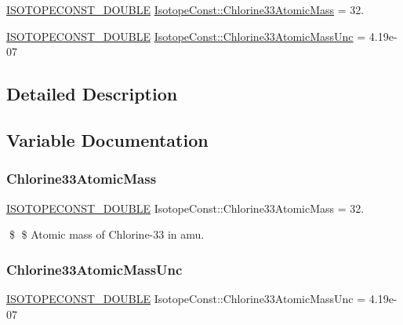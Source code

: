 \begin{DoxyCompactItemize}
\item 
\mbox{\hyperlink{group___isotope_const-_macros_ga8f45a7272ce02c0b4c65c44636ed719a}{I\+S\+O\+T\+O\+P\+E\+C\+O\+N\+S\+T\+\_\+\+D\+O\+U\+B\+LE}} \mbox{\hyperlink{group___isotope_const-_chlorine-_cl33_ga130bfbdbdea8b65bf1d6e512e2c292b9}{Isotope\+Const\+::\+Chlorine33\+Atomic\+Mass}} = 32.
\item 
\mbox{\hyperlink{group___isotope_const-_macros_ga8f45a7272ce02c0b4c65c44636ed719a}{I\+S\+O\+T\+O\+P\+E\+C\+O\+N\+S\+T\+\_\+\+D\+O\+U\+B\+LE}} \mbox{\hyperlink{group___isotope_const-_chlorine-_cl33_ga8fa151dd8b3de5e7e1838c8d92a2bc0d}{Isotope\+Const\+::\+Chlorine33\+Atomic\+Mass\+Unc}} = 4.\+19e-\/07
\end{DoxyCompactItemize}


\subsection{Detailed Description}


\subsection{Variable Documentation}
\mbox{\label{group___isotope_const-_chlorine-_cl33_ga130bfbdbdea8b65bf1d6e512e2c292b9}} 
\subsubsection{\texorpdfstring{Chlorine33\+Atomic\+Mass}{Chlorine33AtomicMass}}
{\footnotesize\ttfamily \mbox{\hyperlink{group___isotope_const-_macros_ga8f45a7272ce02c0b4c65c44636ed719a}{I\+S\+O\+T\+O\+P\+E\+C\+O\+N\+S\+T\+\_\+\+D\+O\+U\+B\+LE}} Isotope\+Const\+::\+Chlorine33\+Atomic\+Mass = 32.}

\$ \$ Atomic mass of Chlorine-\/33 in amu. \mbox{\label{group___isotope_const-_chlorine-_cl33_ga8fa151dd8b3de5e7e1838c8d92a2bc0d}} 
\subsubsection{\texorpdfstring{Chlorine33\+Atomic\+Mass\+Unc}{Chlorine33AtomicMassUnc}}
{\footnotesize\ttfamily \mbox{\hyperlink{group___isotope_const-_macros_ga8f45a7272ce02c0b4c65c44636ed719a}{I\+S\+O\+T\+O\+P\+E\+C\+O\+N\+S\+T\+\_\+\+D\+O\+U\+B\+LE}} Isotope\+Const\+::\+Chlorine33\+Atomic\+Mass\+Unc = 4.\+19e-\/07}


